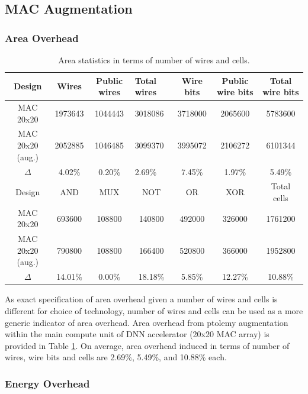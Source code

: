 \documentclass[11pt]{article}
\begin{document}
\subsection{MAC Augmentation}

\subsubsection{Area Overhead}

\begin{table}[H]
  \centering
  \footnotesize
  \begin{tabular}{|c|cccccc|}
  \hline
  Design & Wires & Public wires & \multicolumn{1}{l|}{Total wires} & Wire bits & Public wire bits & Total wire bits \\ \hline
  MAC 20x20 & 1973643 & 1044443 & \multicolumn{1}{l|}{3018086} & 3718000 & 2065600 & 5783600 \\
  MAC 20x20 (aug.) & 2052885 & 1046485 & \multicolumn{1}{l|}{3099370} & 3995072 & 2106272 & 6101344 \\
  $\Delta$ & 4.02\% & 0.20\% & \multicolumn{1}{l|}{2.69\%} & 7.45\% & 1.97\% & 5.49\% \\ \hline
  Design & AND & MUX & NOT & OR & XOR & Total cells \\ \hline
  MAC 20x20 & 693600 & 108800 & 140800 & 492000 & 326000 & 1761200 \\
  MAC 20x20 (aug.) & 790800 & 108800 & 166400 & 520800 & 366000 & 1952800 \\
  $\Delta$ & 14.01\% & 0.00\% & 18.18\% & 5.85\% & 12.27\% & 10.88\% \\ \hline
  \end{tabular}
  \caption{Area statistics in terms of number of wires and cells.\label{tab:cells}}
\end{table}

As exact specification of area overhead given a number of wires and cells is different for choice of technology, number of wires and cells can be used as a more generic indicator of area overhead. Area overhead from ptolemy augmentation within the main compute unit of DNN accelerator (20x20 MAC array) is provided in Table \ref{tab:cells}. On average, area overhead induced in terms of number of wires, wire bits and cells are 2.69\%, 5.49\%, and 10.88\% each.

\subsubsection{Energy Overhead}
\end{document}
